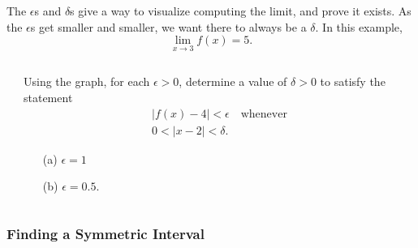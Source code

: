 \documentclass[Cal1Spr16Lectures.tex]{subfiles}
\begin{document}
\begin{frame}{}
The $\epsilon$s and $\delta$s give a way to visualize computing the limit, and prove it exists.  As the $\epsilon$s get smaller and smaller, we want there to always be a $\delta$.  In this example,
\[\lim_{x\to 3}f(x)=5.\]
\end{frame}

\begin{frame}\footnotesize
\begin{exe}
\vspace{0.75pc}
\begin{columns}[T]
	\begin{column}{.22\textwidth}
	\end{column}
	\begin{column}{.6\textwidth}
		Using the graph, for each $\epsilon>0$, determine a value of $\delta>0$ to satisfy the statement
		\begin{multline*}|f(x)-4|<\epsilon\quad\text{whenever} \\
			0<|x-2|<\delta.\end{multline*}  
		\vspace{-1pc}
		\begin{itemize}
		\item[(a) ] $\epsilon=1$ 
		\item[(b) ] $\epsilon=0.5$.
		\end{itemize}
	\end{column}
\end{columns}
\end{exe}
\end{frame} 

\subsubsection{Finding a Symmetric Interval}
\end{document}
